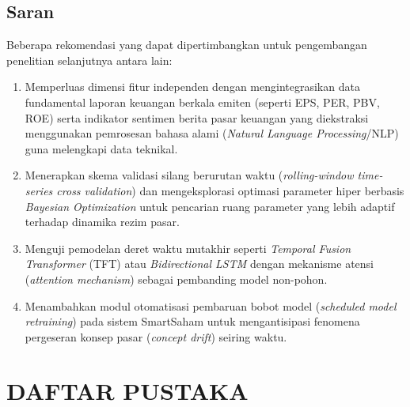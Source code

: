 \documentclass[10pt,a4paper]{article}
\begin{document}
\subsection{Saran}
Beberapa rekomendasi yang dapat dipertimbangkan untuk pengembangan penelitian selanjutnya antara lain:
\begin{enumerate}
  \item Memperluas dimensi fitur independen dengan mengintegrasikan data fundamental laporan keuangan berkala emiten (seperti EPS, PER, PBV, ROE) serta indikator sentimen berita pasar keuangan yang diekstraksi menggunakan pemrosesan bahasa alami (\textit{Natural Language Processing}/NLP) guna melengkapi data teknikal.
  \item Menerapkan skema validasi silang berurutan waktu (\textit{rolling-window time-series cross validation}) dan mengeksplorasi optimasi parameter hiper berbasis \textit{Bayesian Optimization} untuk pencarian ruang parameter yang lebih adaptif terhadap dinamika rezim pasar.
  \item Menguji pemodelan deret waktu mutakhir seperti \textit{Temporal Fusion Transformer} (TFT) atau \textit{Bidirectional LSTM} dengan mekanisme atensi (\textit{attention mechanism}) sebagai pembanding model non-pohon.
  \item Menambahkan modul otomatisasi pembaruan bobot model (\textit{scheduled model retraining}) pada sistem SmartSaham untuk mengantisipasi fenomena pergeseran konsep pasar (\textit{concept drift}) seiring waktu.
\end{enumerate}

\section*{DAFTAR PUSTAKA}
\end{document}
